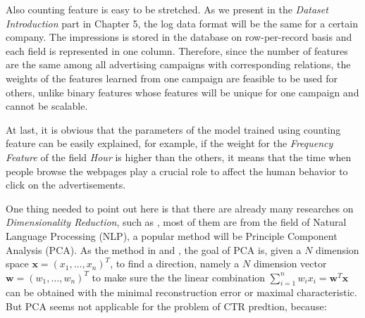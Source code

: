 Also counting feature is easy to be stretched. As we present in the \textit{Dataset Introduction} part in Chapter 5, the log data format will be the same for a certain company. The impressions is stored in the database on row-per-record basis and each field is represented in one column. Therefore, since the number of features are the same among all advertising campaigns with corresponding relations, the weights of the features learned from one campaign are feasible to be used for others, unlike binary features whose features will be unique for one campaign and cannot be scalable. 

At last, it is obvious that the parameters of the model trained using counting feature can be easily explained, for example, if the weight for the \textit{Frequency Feature} of the field \textit{Hour} is higher than the others, it means that the time when people browse the webpages play a crucial role to affect the human behavior to click on the advertisements.

One thing needed to point out here is that there are already many researches on \textit{Dimensionality Reduction}, such as \cite{burges2009dimension}, most of them are from the field of Natural Language Processing (NLP), a popular method will be Principle Component Analysis (PCA). As the method in \cite{fruergaard2013dimensionality} and \cite{dimensionreduct}, the goal of PCA is, given a \(N\) dimension space \(\mathbf{x}=(x_1,\ldots,x_n)^T\), to find a direction, namely a \(N\) dimension vector \(\mathbf{w}=(w_1,\ldots,w_n)^T\) to make sure the the linear combination \(\sum_{i=1}^nw_ix_i=\mathbf{w}^T\mathbf{x}\) can be obtained with the minimal reconstruction error or maximal characteristic. But PCA seems not applicable for the problem of CTR predtion, because:

